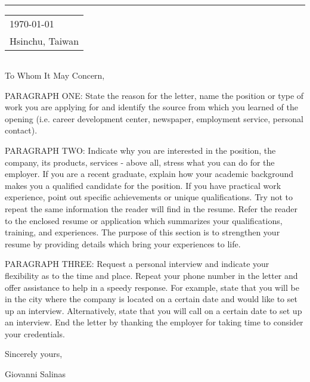 \documentclass{article}
\begin{document}
\vspace*{\dimexpr-\headsep-\headheight-1pt}


\rule{\linewidth}{1pt}

\bigskip\bigskip

\hfill
\begin{tabular}{ l @{} }
  \today \\[12pt] %
    Hsinchu, Taiwan \\
\end{tabular}

\bigskip

\begin{tabular}{ @{} l }
\end{tabular}

\bigskip

To Whom It May Concern,

\bigskip

PARAGRAPH ONE: State the reason for the letter, name the position or type of work you are applying for and identify the source from which you learned of the opening (i.e. career development center, newspaper, employment service, personal contact).

PARAGRAPH TWO: Indicate why you are interested in the position, the company, its products, services - above all, stress what you can do for the employer. If you are a recent graduate, explain how your academic background makes you a qualified candidate for the position. If you have practical work experience, point out specific achievements or unique qualifications. Try not to repeat the same information the reader will find in the resume. Refer the reader to the enclosed resume or application which summarizes your qualifications, training, and experiences. The purpose of this section is to strengthen your resume by providing details which bring your experiences to life.

PARAGRAPH THREE: Request a personal interview and indicate your flexibility as to the time and place. Repeat your phone number in the letter and offer assistance to help in a speedy response. For example, state that you will be in the city where the company is located on a certain date and would like to set up an interview. Alternatively, state that you will call on a certain date to set up an interview. End the letter by thanking the employer for taking time to consider your credentials.

\bigskip

\hfill
Sincerely yours,

\vspace{50pt}

\hfill
Giovanni Salinas
\end{document}
